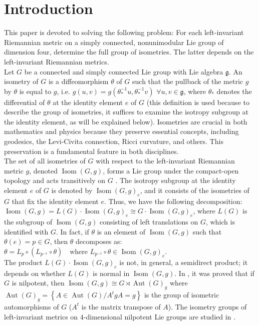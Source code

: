 \documentclass[12pt,a4paper,twoside]{article}
\theoremstyle{definition}
\begin{document}
\section{Introduction}
\hspace*{3mm}     This paper is devoted to solving the following problem: For each left-invariant Riemannian metric on a simply connected, nonunimodular Lie group of dimension four, determine the full group of isometries. The latter depends on the left-invariant Riemannian metrics.\\
Let $G$ be a connected and simply connected Lie group with Lie algebra $\mathfrak{g}$. An isometry of $G$ is a diffeomorphism $\theta$ of $G$ such that the pullback of the metric $g$ by $\theta$ is equal to $g$, i.e. $g(u, v) = g(\theta_{\ast}^{-1}u, \theta_{\ast}^{-1}v) \,\, \forall u, v\in \mathfrak{g}$, where $\theta_{\ast}$ denotes the differential of $\theta$ at the identity element $e$ of $G$ (this definition is used because to describe the group of isometries, it suffices to examine the isotropy subgroup at the identity element, as will be explained below). Isometries are crucial in both mathematics and physics because they preserve essential concepts, including geodesics, the Levi-Civita connection, Ricci curvature, and others. This preservation is a fundamental feature in both disciplines.\\
The set of all isometries of $G$ with respect to the left-invariant Riemannian metric $g$, denoted $\operatorname{Isom}(G, g)$, forms a Lie group under the compact-open topology and acts transitively on $G$ \cite{myers1939group}. The isotropy subgroup at the identity element $e$ of $G$ is denoted by $\operatorname{Isom}(G, g)_{e}$, and it consists of the isometries of $G$ that fix the identity element $e$. Thus, we have the following decomposition: $\operatorname{Isom}(G, g) = L(G) \cdot \operatorname{Isom}(G, g)_{e} \cong G \cdot \operatorname{Isom}(G, g)_{e}$, where $L(G)$ is the subgroup of $\operatorname{Isom}(G, g)$ consisting of left translations on $G$, which is identified with $G$. In fact, if $\theta$ is an element of $\operatorname{Isom}(G, g)$ such that $\theta(e) = p \in G$, then $\theta$ decomposes as: $\theta = L_{p} \circ (L_{p^{-1}} \circ \theta) \quad \text{where}\,\, L_{p^{-1}} \circ \theta \in \operatorname{Isom}(G, g)_{e}$.\\
The product $L(G) \cdot \operatorname{Isom}(G, g)_{e}$ is not, in general, a semidirect product; it depends on whether $L(G)$ is normal in $\operatorname{Isom}(G, g)$. In \cite{wolf1962locally,wilson1982isometry}, it was proved that if $G$ is nilpotent, then $\operatorname{Isom}(G, g) \cong G \rtimes \operatorname{Aut}(G)_{g}$ where $\operatorname{Aut}(G)_{g} = \left\lbrace A \in \operatorname{Aut}(G) / A^tgA = g\right\rbrace$ is the group of isometric automorphisms of $G$ ($A^t$ is the matrix transpose of $A$). The isometry groups of left-invariant metrics on $4$-dimensional nilpotent Lie groups are studied in \cite{ayad2024isometry,vsukilovic2017isometry}.\\
\end{document}
